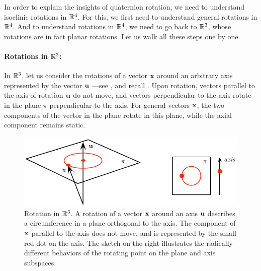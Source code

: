In order to explain the insights of quaternion rotation, %
we need to understand isoclinic rotations in ${\mathbb R}^4$. 
For this, we first need to understand general rotations in ${\mathbb R}^4$.
And to understand rotations in ${\mathbb R}^4$, we need to go back to ${\mathbb R}^3$, whose rotations are in fact planar rotations.
Let us walk all these steps one by one.


\paragraph{Rotations in ${\mathbb R}^3$:} 
%
In ${\mathbb R}^3$, let us consider the rotations of a vector ${\bf x}$ around an arbitrary axis represented by the vector ${\bf u}$ ---see , and recall  . 
Upon rotation, vectors parallel to the axis of rotation ${\bf u}$ do not move, and  vectors perpendicular to the axis rotate in the plane $\pi$ perpendicular to the axis. 
For general vectors ${\bf x}$, the two components of the vector in the plane rotate in this plane, while the axial component remains static.
%
\begin{figure}[tb]
\begin{center}
\includegraphics{figures/isoclinic3}
\caption{%
Rotation in ${\mathbb R}^3$. 
A rotation of a vector ${\bf x}$ around an axis ${\bf u}$ describes a circumference in a plane orthogonal to the axis. 
The component of ${\bf x}$ parallel to the axis does not move, and is represented by the small red dot on the axis.
The sketch on the right illustrates the radically different behaviors of the rotating point on the plane and axis subspaces. 
}
\label{fig:isoclinic3}
\end{center}
\end{figure}


